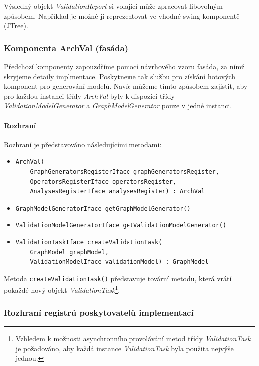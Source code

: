 Výsledný objekt \emph{ValidationReport} si volající může zpracovat libovolným způsobem. Například je možné ji reprezentovat ve vhodné swing komponentě (JTree).

\subsubsection{Komponenta ArchVal (fasáda)}
Předchozí komponenty zapouzdříme pomocí návrhového vzoru fasáda, za nímž skryjeme detaily implmentace. Poskytneme tak službu pro získání hotových komponent pro generování modelů. Navíc můžeme tímto způsobem zajistit, aby pro každou instanci třídy \emph{ArchVal} byly k dispozici třídy \emph{ValidationModelGenerator} a \emph{GraphModelGenerator} pouze v jedné instanci.

\paragraph{Rozhraní} Rozhraní je představováno následujícími metodami:
\begin{itemize}
\item \begin{verbatim}ArchVal(
    GraphGeneratorsRegisterIface graphGeneratorsRegister,
    OperatorsRegisterIface operatorsRegister,
    AnalysesRegisterIface analysesRegister) : ArchVal\end{verbatim}
\item \verb-GraphModelGeneratorIface getGraphModelGenerator()-
\item \verb-ValidationModelGeneratorIface getValidationModelGenerator()-
\item \begin{verbatim}ValidationTaskIface createValidationTask(
    GraphModel graphModel,
    ValidationModelIface validationModel) : GraphModel\end{verbatim}
\end{itemize}

Metoda \verb-createValidationTask()- představuje tovární metodu, která vrátí pokaždé nový objekt \emph{ValidationTask}\footnote{Vzhledem k možnosti asynchronního provolávání metod třídy \emph{ValidationTask} je požadováno, aby každá instance \emph{ValidationTask} byla použita nejvýše jednou.}.

\subsubsection{Rozhraní registrů poskytovatelů implementací}

